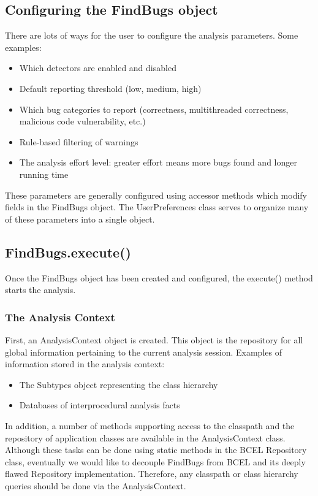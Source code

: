 \documentclass[11pt]{article}
\begin{document}
\subsection{Configuring the FindBugs object}

There are lots of ways for the user to configure the analysis parameters.
Some examples:
\begin{itemize}
\item Which detectors are enabled and disabled
\item Default reporting threshold (low, medium, high)
\item Which bug categories to report (correctness, multithreaded correctness,
      malicious code vulnerability, etc.)
\item Rule-based filtering of warnings
\item The analysis effort level: greater effort means more bugs found and longer running time
\end{itemize}

These parameters are generally configured using accessor methods which
modify fields in the FindBugs object.  The UserPreferences class serves
to organize many of these parameters into a single object.

\subsection{FindBugs.execute()}

Once the FindBugs object has been created and configured, the execute() method
starts the analysis.

\subsubsection{The Analysis Context}

First, an AnalysisContext object is created.  This object is the repository for
all global information pertaining to the current analysis session.
Examples of information stored in the analysis context:
\begin{itemize}
\item The Subtypes object representing the class hierarchy
\item Databases of interprocedural analysis facts
\end{itemize}

In addition, a number of methods supporting access to the classpath and the
repository of application classes are available in the AnalysisContext class.
Although these tasks can be done using static methods in the BCEL
Repository class, eventually we would like to decouple FindBugs from BCEL
and its deeply flawed Repository implementation.  Therefore, any classpath
or class hierarchy queries should be done via the AnalysisContext.
\end{document}
